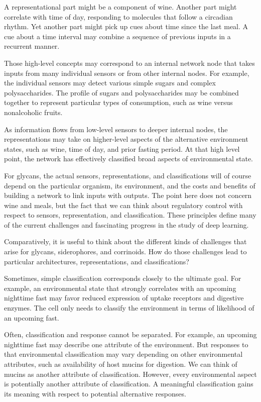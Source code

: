 \documentclass[\mydocfontsize]{article}
\begin{document}
\begin{multicols}{2}
A representational part might be a component of wine. Another part might correlate with time of day, responding to molecules that follow a circadian rhythm. Yet another part might pick up cues about time since the last meal. A cue about a time interval may combine a sequence of previous inputs in a recurrent manner. 

Those high-level concepts may correspond to an internal network node that takes inputs from many individual sensors or from other internal nodes. For example, the individual sensors may detect various simple sugars and complex polysaccharides. The profile of sugars and polysaccharides may be combined together to represent particular types of consumption, such as wine versus nonalcoholic fruits. 

As information flows from low-level sensors to deeper internal nodes, the representations may take on higher-level aspects of the alternative environment states, such as wine, time  of day, and prior fasting period. At that high level point, the network has effectively classified broad aspects of environmental state.

For glycans, the actual sensors, representations, and classifications will of course depend on the particular organism, its environment, and the costs and benefits of building a network to link inputs with outputs. The point here does not concern wine and meals, but the fact that we can think about regulatory control with respect to sensors, representation, and classification. These principles define many of the current challenges and fascinating progress in the study of deep learning.

Comparatively, it is useful to think about the different kinds of challenges that arise for glycans, siderophores, and corrinoids. How do those challenges lead to particular architectures, representations, and classifications? 

 Sometimes, simple classification corresponds closely to the ultimate goal. For example, an environmental state that strongly correlates with an upcoming nighttime fast may favor reduced expression of uptake receptors and digestive enzymes. The cell only needs to classify the environment in terms of likelihood of an upcoming fast. 

Often, classification and response cannot be separated. For example, an upcoming nighttime fast may describe one attribute of the environment. But responses to that environmental classification may vary depending on other environmental attributes, such as availability of host mucins for digestion. We can think of mucins as another attribute of classification. However, every environmental aspect is potentially another attribute of classification. A meaningful classification gains its meaning with respect to potential alternative responses. 


\end{multicols}
\end{document}
